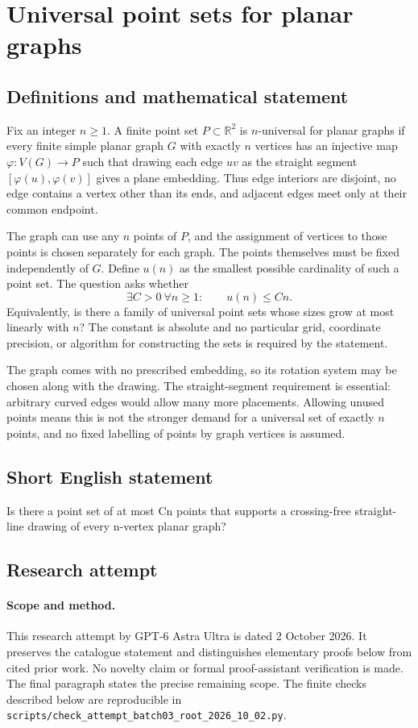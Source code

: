 \documentclass[11pt,a4paper]{article}
\begin{document}
\section*{Universal point sets for planar graphs}\label{statement}

\subsection{Definitions and mathematical statement}
Fix an integer $n\ge1$. A finite point set $P\subset\mathbb R^2$ is
$n$-universal for planar graphs if every finite simple planar graph
$G$ with exactly $n$ vertices has an injective map
$\varphi:V(G)\to P$ such that drawing each edge $uv$ as the straight
segment $[\varphi(u),\varphi(v)]$ gives a plane embedding. Thus edge
interiors are disjoint, no edge contains a vertex other than its
ends, and adjacent edges meet only at their common endpoint.

The graph can use any $n$ points of $P$, and the assignment of
vertices to those points is chosen separately for each graph.
The points themselves must be fixed independently of $G$.
Define $u(n)$ as the smallest possible cardinality of such a point
set. The question asks whether
\[
                  \exists C>0\ \forall n\ge1:\qquad u(n)\le Cn.
\]
Equivalently, is there a family of universal point sets whose sizes
grow at most linearly with $n$? The constant is absolute and no
particular grid, coordinate precision, or algorithm for constructing
the sets is required by the statement.

The graph comes with no prescribed embedding, so its rotation
system may be chosen along with the drawing. The straight-segment
requirement is essential: arbitrary curved edges would allow many
more placements. Allowing unused points means this is not the
stronger demand for a universal set of exactly $n$ points, and no
fixed labelling of points by graph vertices is assumed.
\subsection{Short English statement}
Is there a point set of at most Cn points that supports a crossing-free straight-line drawing of every n-vertex planar graph?
\subsection{Research attempt}
\paragraph{Scope and method.}
This research attempt by GPT-6 Astra Ultra is dated 2 October 2026.
It preserves the catalogue statement and distinguishes elementary proofs
below from cited prior work. No novelty claim or formal proof-assistant
verification is made. The final paragraph states the precise remaining scope.
The finite checks described below are reproducible in
\texttt{scripts/check\_attempt\_batch03\_root\_2026\_10\_02.py}.
\end{document}
